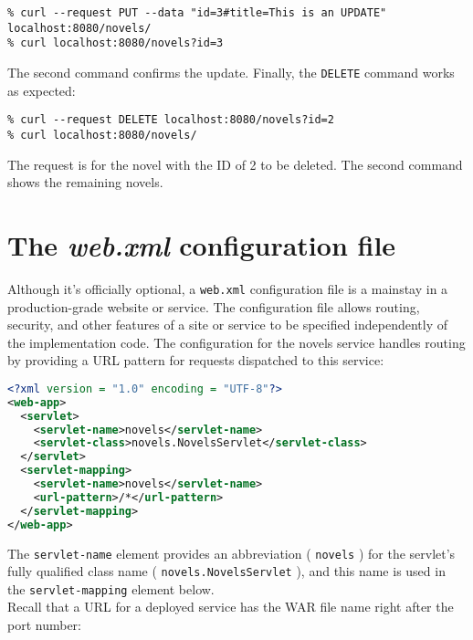 \documentclass[12pt]{article}
\begin{document}
\begin{lstlisting}
% curl --request PUT --data "id=3#title=This is an UPDATE" localhost:8080/novels/
% curl localhost:8080/novels?id=3

\end{lstlisting}

The second command confirms the update. Finally, the \verb|DELETE| command works as expected:\\

\begin{lstlisting}
% curl --request DELETE localhost:8080/novels?id=2
% curl localhost:8080/novels/

\end{lstlisting}

The request is for the novel with the ID of 2 to be deleted. The second command shows the remaining novels.\\


\section{The \textit{web.xml} configuration file}

Although it's officially optional, a \verb|web.xml| configuration file is a mainstay in a production-grade website or service. The configuration file allows routing, security, and other features of a site or service to be specified independently of the implementation code. The configuration for the novels service handles routing by providing a URL pattern for requests dispatched to this service:\\

\begin{lstlisting}[language=xml]
<?xml version = "1.0" encoding = "UTF-8"?>
<web-app>
  <servlet>
    <servlet-name>novels</servlet-name>
    <servlet-class>novels.NovelsServlet</servlet-class>
  </servlet>
  <servlet-mapping>
    <servlet-name>novels</servlet-name>
    <url-pattern>/*</url-pattern>
  </servlet-mapping>
</web-app>

\end{lstlisting}

The \verb|servlet-name| element provides an abbreviation ( \verb|novels| ) for the servlet's fully qualified class name ( \verb|novels.NovelsServlet| ), and this name is used in the \verb|servlet-mapping| element below.\\

Recall that a URL for a deployed service has the WAR file name right after the port number:\\
\end{document}
